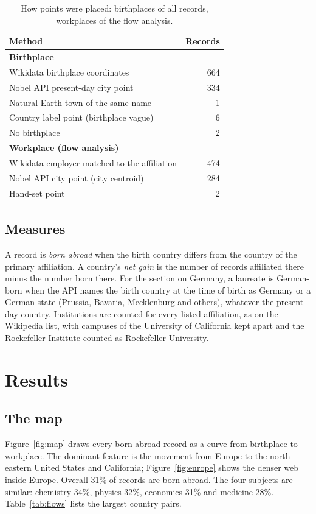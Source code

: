 \documentclass[11pt,a4paper]{article}
\begin{document}
\begin{table}[tbp]\centering\small\caption{How points were placed: birthplaces of all records, workplaces of the flow analysis.}\label{tab:methods}\begin{tabular}{p{10.5cm}r}\toprule Method & Records\\\midrule
\textbf{Birthplace} & \\
Wikidata birthplace coordinates & 664\\
Nobel API present-day city point & 334\\
Natural Earth town of the same name & 1\\
Country label point (birthplace vague) & 6\\
No birthplace & 2\\
\textbf{Workplace (flow analysis)} & \\
Wikidata employer matched to the affiliation & 474\\
Nobel API city point (city centroid) & 284\\
Hand-set point & 2\\
\bottomrule\end{tabular}\end{table}

\subsection{Measures}
A record is \emph{born abroad} when the birth country differs from the country of the primary affiliation. A country's \emph{net gain} is the number of records affiliated there minus the number born there. For the section on Germany, a laureate is German-born when the API names the birth country at the time of birth as Germany or a German state (Prussia, Bavaria, Mecklenburg and others), whatever the present-day country. Institutions are counted for every listed affiliation, as on the Wikipedia list, with campuses of the University of California kept apart and the Rockefeller Institute counted as Rockefeller University.

\section{Results}
\subsection{The map}
Figure~\ref{fig:map} draws every born-abroad record as a curve from birthplace to workplace. The dominant feature is the movement from Europe to the north-eastern United States and California; Figure~\ref{fig:europe} shows the denser web inside Europe. Overall 31\% of records are born abroad. The four subjects are similar: chemistry 34\%, physics 32\%, economics 31\% and medicine 28\%. Table~\ref{tab:flows} lists the largest country pairs.
\end{document}
